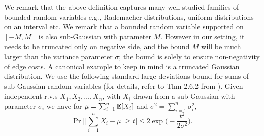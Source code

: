 We remark that the above definition captures many well-studied families of bounded random variables e.g., Rademacher distributions, uniform distributions on an interval etc. We remark that a bounded random variable supported on $[-M,M]$ is also sub-Gaussian with parameter $M$. However in our setting, it needs to be truncated only on negative side, and the bound $M$ will be much larger than the variance parameter $\sigma$; the bound is solely to ensure non-negativity of edge costs. A canonical example to keep in mind is a truncated Gaussian distribution.%
We use the following standard large deviations bound for sums of sub-Gaussian random variables (for details, refer to Thm 2.6.2 from \citet{vershynin_hdp}). Given independent r.v.s $X_1, X_2, \dots, X_n$, with $X_i$ drawn from a sub-Gaussian with parameter $\sigma_i$ we have for $\mu=\sum_{i=1}^n \operatorname*{\mathbb{E}}[X_i]$ and $\sigma^2 = \sum_{i=1}^n \sigma_i^2$,
\begin{equation}\label{eq:deviationbound}
    \Pr\Big[ \Big| \sum_{i=1}^n X_i - \mu \Big| \ge t \Big] \le 2\exp\Big(-\frac{t^2}{2\sigma^2} \Big).
\end{equation} 

\dswhp*


